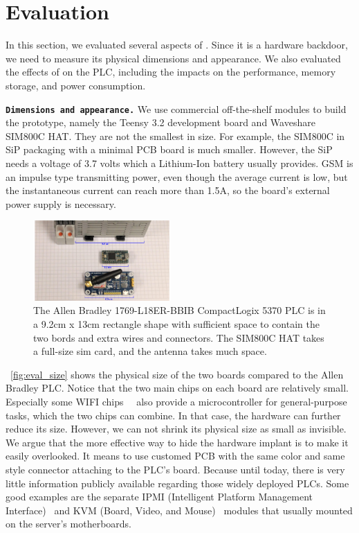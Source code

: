 \section{Evaluation}
\label{sec:implant-evaluation}

In this section, we evaluated several aspects of \name. Since it is a hardware backdoor, we need to measure its physical dimensions and appearance. We also evaluated the effects of \name on the PLC, including the impacts on the performance, memory storage, and power consumption.

\texttt{\textbf{Dimensions and appearance.}} We use commercial off-the-shelf modules to build the prototype, namely the Teensy 3.2 development board and Waveshare SIM800C HAT. They are not the smallest in size. For example,  the SIM800C in SiP packaging with a minimal PCB board is much smaller. However, the SiP needs a voltage of 3.7 volts which a Lithium-Ion battery usually provides. GSM is an impulse type transmitting power, even though the average current is low, but the instantaneous current can reach more than 1.5A, so the board's external power supply is necessary. 

\begin{figure}[th]
	\includegraphics[width=0.47\textwidth]{figures/eval_size}
	\centering
	\caption{The Allen Bradley 1769-L18ER-BBIB CompactLogix
	5370 PLC is in a 9.2cm x 13cm rectangle shape with sufficient space to contain the two bords and extra wires and connectors. The SIM800C HAT takes a full-size sim card, and the antenna takes much space.}
	\label{fig:eval_size}
\end{figure}

~\autoref{fig:eval_size} shows the physical size of the two boards compared to the Allen Bradley PLC. Notice that the two main chips on each board are relatively small. Especially some WIFI chips~\cite{babiuch2019using}~\cite{artenstein2017broadpwn} also provide a microcontroller for general-purpose tasks, which the two chips can combine.  In that case, the hardware can further reduce its size. However, we can not shrink its physical size as small as invisible.  We argue that the more effective way to hide the hardware implant is to make it easily overlooked. It means to use customed PCB with the same color and same style connector attaching to the PLC's board. Because until today, there is very little information publicly available regarding those widely deployed PLCs.  Some good examples are the separate IPMI (Intelligent Platform Management Interface)~\cite{slaight2003using} and KVM (Board, Video, and Mouse)~\cite{kedziorek2007hpc} modules that usually mounted on the server's motherboards.

